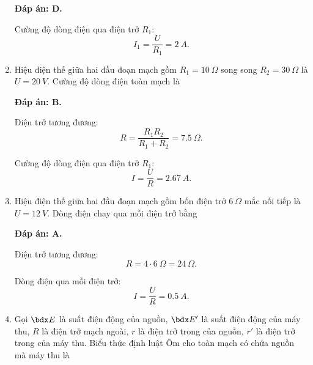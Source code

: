 \begin{enumerate}[label=\bfseries Câu \arabic*:]
{	}
	\loigiai
	{	\textbf{Đáp án: D.}
		
		Cường độ dòng điện qua điện trở $R_1$:
		$$I_1 = \dfrac{U}{R_1} = \SI{2}{A}.$$
	}
	\item {}
	
	\cauhoi
	{Hiệu điện thế giữa hai đầu đoạn mạch gồm $R_1=\SI{10}{\Omega}$ song song $R_2=\SI{30}{\Omega}$ là $U=\SI{20}{V}$. Cường độ dòng điện toàn mạch là
		
	}
	\loigiai
	{	\textbf{Đáp án: B.}
		
		Điện trở tương đương:
		$$R=\dfrac{R_1 R_2}{R_1 + R_2} = \SI{7.5}{\Omega}.$$
		
		Cường độ dòng điện qua điện trở $R_1$:
		$$I=\dfrac{U}{R} = \SI{2.67}{A}.$$
	}
	\item {}
	
	\cauhoi
	{Hiệu điện thế giữa hai đầu đoạn mạch gồm bốn điện trở $\SI{6}{\Omega}$ mắc nối tiếp là $U=\SI{12}{V}$. Dòng điện chay qua mỗi điện trở bằng
		
	}
	\loigiai
	{	\textbf{Đáp án: A.}
		
		Điện trở tương đương:
		$$R=4 \cdot \SI{6}{\Omega} = \SI{24}{\Omega}.$$
		
		Dòng điện qua mỗi điện trở:
		$$I=\dfrac{U}{R} = \SI{0.5}{A}.$$
	}
	\item {}
	
	\cauhoi
	{Gọi $\calE$ là suất điện động của nguồn, $\calE'$ là suất điện động của máy thu, $R$ là điện trở mạch ngoài, $r$ là điện trở trong của nguồn, $r'$ là điện trở trong của máy thu. Biểu thức định luật Ôm cho toàn mạch có chứa nguồn mà máy thu là
		
}
\end{enumerate}

